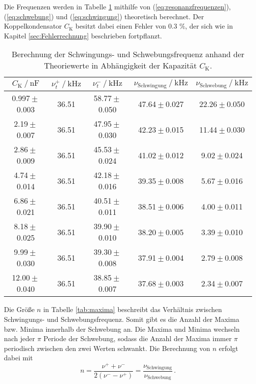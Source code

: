 Die Frequenzen werden in Tabelle \ref{tab:schwebung} mithilfe von (\ref{eq:resonanzfrequenzen}), 
(\ref{eq:schwebung}) und (\ref{eq:schwingung}) theoretisch berechnet. Der Koppelkondensator
$C_\text{K}$ besitzt dabei einen Fehler von 0.3 $\unit{\percent}$, der sich wie in Kapitel 
\ref{sec:Fehlerrechnung} beschrieben fortpflanzt.
\begin{table}
    \centering
    \caption{   Berechnung der Schwingungs- und Schwebungsfrequenz anhand der Theoriewerte
                in Abhängigkeit der Kapazität $C_\text{K}$. }
    \label{tab:schwebung}
    \begin{tabular}{c c c c c}
        \toprule
        ${C_\text{K}} \mathbin{/} \unit{\nano\farad}$ &
        $\nu^+_{t} \mathbin{/} \unit{\kilo\hertz}$ &
        $\nu^-_{t} \mathbin{/} \unit{\kilo\hertz}$ &
        $\nu_\text{Schwingung} \mathbin{/} \unit{\kilo\hertz}$ &
        $\nu_\text{Schwebung} \mathbin{/} \unit{\kilo\hertz}$ \\
        \midrule
         0.997${}\pm{}$0.003 &    36.51 & 58.77${}\pm{}$0.050 &    47.64${}\pm{}$0.027 &   22.26${}\pm{}$0.050 \\
          2.19${}\pm{}$0.007 &    36.51 & 47.95${}\pm{}$0.030 &    42.23${}\pm{}$0.015 &   11.44${}\pm{}$0.030 \\
          2.86${}\pm{}$0.009 &    36.51 & 45.53${}\pm{}$0.024 &    41.02${}\pm{}$0.012 &    9.02${}\pm{}$0.024 \\
          4.74${}\pm{}$0.014 &    36.51 & 42.18${}\pm{}$0.016 &    39.35${}\pm{}$0.008 &    5.67${}\pm{}$0.016 \\
          6.86${}\pm{}$0.021 &    36.51 & 40.51${}\pm{}$0.011 &    38.51${}\pm{}$0.006 &    4.00${}\pm{}$0.011 \\
          8.18${}\pm{}$0.025 &    36.51 & 39.90${}\pm{}$0.010 &    38.20${}\pm{}$0.005 &    3.39${}\pm{}$0.010 \\
          9.99${}\pm{}$0.030 &    36.51 & 39.30${}\pm{}$0.008 &    37.91${}\pm{}$0.004 &    2.79${}\pm{}$0.008 \\
         12.00${}\pm{}$0.040 &    36.51 & 38.85${}\pm{}$0.007 &    37.68${}\pm{}$0.003 &    2.34${}\pm{}$0.007 \\
        \bottomrule
    \end{tabular}
\end{table}

Die Größe $n$ in Tabelle \ref{tab:maxima} beschreibt das Verhältnis zwischen Schwingungs- und 
Schwebungsfrequenz. Somit gibt es die Anzahl der Maxima bzw. Minima innerhalb der Schwebung an. 
Die Maxima und Minima wechseln nach jeder $\pi$ Periode der Schwebung, sodass die Anzahl der Maxima
immer $\pi$ periodisch zwischen den zwei Werten schwankt. Die Berechnung von $n$ erfolgt dabei mit
\begin{equation}
    n=\frac{\nu^+ + \nu^-}{2\left(\nu^- - \nu^+\right)}=\frac{\nu_{\text{Schwingung}}}{\nu_{\text{Schwebung}}} \, .
\end{equation}

